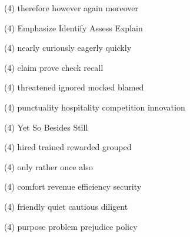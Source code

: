 \item
\begin{tasks}(4)
	\task therefore
	\task however
	\task again
	\task moreover
\end{tasks}
\item
\begin{tasks}(4)
	\task Emphasize
	\task Identify
	\task Assess
	\task Explain
\end{tasks}
\item
\begin{tasks}(4)
	\task nearly
	\task curiously
	\task eagerly
	\task quickly
\end{tasks}
\item
\begin{tasks}(4)
	\task claim
	\task prove
	\task check
	\task recall
\end{tasks}
\item
\begin{tasks}(4)
	\task threatened
	\task ignored
	\task mocked
	\task blamed
\end{tasks}
\item
\begin{tasks}(4)
	\task punctuality
	\task hospitality
	\task competition
	\task innovation
\end{tasks}
\item
\begin{tasks}(4)
	\task Yet
	\task So
	\task Besides
	\task Still
\end{tasks}
\item
\begin{tasks}(4)
	\task hired
	\task trained
	\task rewarded
	\task grouped
\end{tasks}
\item
\begin{tasks}(4)
	\task only
	\task rather
	\task once
	\task also
\end{tasks}
\item
\begin{tasks}(4)
	\task comfort
	\task revenue
	\task efficiency
	\task security
\end{tasks}
\item
\begin{tasks}(4)
	\task friendly
	\task quiet
	\task cautious
	\task diligent
\end{tasks}
\item
\begin{tasks}(4)
	\task purpose
	\task problem
	\task prejudice
	\task policy
\end{tasks}
\item
